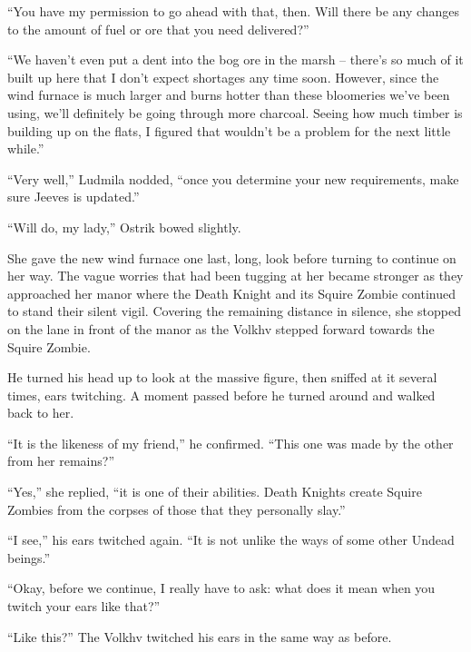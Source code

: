  

“You have my permission to go ahead with that, then. Will there be any changes to the amount of fuel or ore that you need delivered?”

 

“We haven’t even put a dent into the bog ore in the marsh – there’s so much of it built up here that I don’t expect shortages any time soon. However, since the wind furnace is much larger and burns hotter than these bloomeries we’ve been using, we’ll definitely be going through more charcoal. Seeing how much timber is building up on the flats, I figured that wouldn’t be a problem for the next little while.”

 

“Very well,” Ludmila nodded, “once you determine your new requirements, make sure Jeeves is updated.”

 

“Will do, my lady,” Ostrik bowed slightly.

 

She gave the new wind furnace one last, long, look before turning to continue on her way. The vague worries that had been tugging at her became stronger as they approached her manor where the Death Knight and its Squire Zombie continued to stand their silent vigil. Covering the remaining distance in silence, she stopped on the lane in front of the manor as the Volkhv stepped forward towards the Squire Zombie.

 

He turned his head up to look at the massive figure, then sniffed at it several times, ears twitching. A moment passed before he turned around and walked back to her.

 

“It is the likeness of my friend,” he confirmed. “This one was made by the other from her remains?”

 

“Yes,” she replied, “it is one of their abilities. Death Knights create Squire Zombies from the corpses of those that they personally slay.”

 

“I see,” his ears twitched again. “It is not unlike the ways of some other Undead beings.”

 

“Okay, before we continue, I really have to ask: what does it mean when you twitch your ears like that?”

 

“Like this?” The Volkhv twitched his ears in the same way as before.

